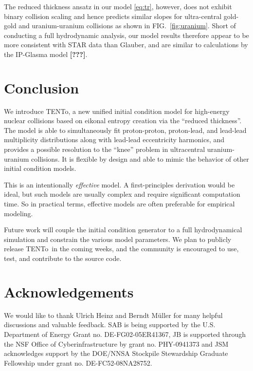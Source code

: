 \documentclass[aps,prl,reprint,amsmath,nofootinbib]{revtex4-1}
\newcommand{\trento}{T\raisebox{-.5ex}{R}ENTo}
\newcommand{\needcite}{\textbf{[???]}}
\begin{document}
The reduced thickness ansatz in our model \eqref{eq:tr}, however, does not exhibit binary collision scaling and hence predicts similar slopes for ultra-central 
gold-gold and uranium-uranium collisions as shown in FIG.~\ref{fig:uranium}. Short of conducting a full hydrodynamic analysis, our model results therefore appear to be more consistent 
with STAR data than Glauber, and are similar to calculations by the IP-Glasma model \needcite.


\section{Conclusion}

We introduce \trento, a new unified initial condition model for high-energy nuclear collisions based on
eikonal entropy creation via the ``reduced thickness''.  The model is able to simultaneously fit
proton-proton, proton-lead, and lead-lead multiplicity distributions along with lead-lead eccentricity
harmonics, and provides a possible resolution to the ``knee'' problem in ultracentral uranium-uranium
collisions.  It is flexible by design and able to mimic the behavior of other initial condition models.

This is an intentionally \emph{effective} model.  A first-principles derivation would be ideal, but such
models are usually complex and require significant computation time.  So in practical terms, effective models
are often preferable for empirical modeling.

Future work will couple the initial condition generator to a full hydrodynamical simulation and constrain the
various model parameters.  We plan to publicly release \trento\ in the coming weeks, and the community is
encouraged to use, test, and contribute to the source code.

\section*{Acknowledgements}

We would like to thank Ulrich Heinz and Berndt M\"uller for many helpful discussions and valuable feedback. 
SAB is being supported by the U.S. Department of Energy Grant no. DE-FG02-05ER41367, JB is supported through the NSF Office of Cyberinfrastructure by grant no. PHY-0941373 and JSM acknowledges support by the DOE/NNSA Stockpile Stewardship Graduate Fellowship under 
grant no. DE-FC52-08NA28752.


\end{document}
